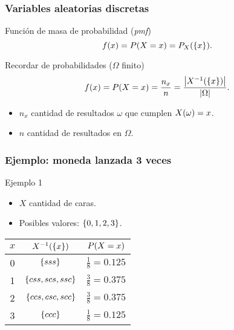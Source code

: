 \documentclass[table]{beamer}
\begin{document}
\begin{frame}
    \frametitle{Variables aleatorias discretas}
    \begin{block}{Función de masa de probabilidad (\emph{pmf})}
        \begin{equation*}
            \ff{x} = \prob{X = x} = \pprob{X}{\bparens{x}} .
        \end{equation*}
    \end{block}
    \begin{block}{Recordar de probabilidades ($\Omega$ finito)}
        \begin{equation*}
            \ff{x} = \prob{X = x} = \frac{n_{x}}{n} = \frac{\vparens{X^{-1} \parens{\bparens{x}}}}{\vparens{\Omega}}.
        \end{equation*}
        \begin{itemize}
            \item $n_{x}$ cantidad de resultados $\omega$ que cumplen $X \parens{\omega} = x$.
            \item $n$ cantidad de resultados en $\Omega$.
        \end{itemize}
    \end{block}
\end{frame}

\begin{frame}
    \frametitle{Ejemplo: moneda lanzada 3 veces}
    \begin{exampleblock}{Ejemplo 1}
        \begin{itemize}
            \item $X$ cantidad de caras.
            \item Posibles valores: $\bparens{0, 1, 2, 3}$.
        \end{itemize}
    \end{exampleblock}
    \begin{center}
        \begin{tabular}{ccc}
            $x$ & $X^{-1} \parens{\bparens{x}}$ & $\prob{X = x}$ \\
            \hline
            0 & $\bparens{sss}$ & $\frac{1}{8} = 0.125$ \\
            1 & $\bparens{css, scs, ssc}$ & $\frac{3}{8} = 0.375$ \\
            2 & $\bparens{ccs, csc, scc}$ & $\frac{3}{8} = 0.375$ \\
            3 & $\bparens{ccc}$ & $\frac{1}{8} = 0.125$
        \end{tabular}
    \end{center}
\end{frame}
\end{document}
